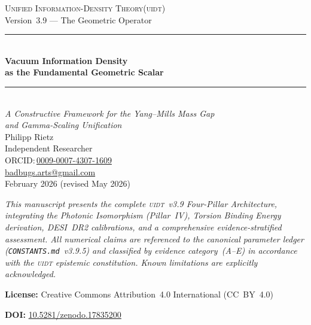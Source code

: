 \begin{titlepage}
\pagestyle{empty}
\begin{center}

\vspace*{1.5cm}

{\large\scshape Unified Information-Density Theory\quad(\textsc{uidt})}\\[0.4cm]
{\normalsize Version~3.9 --- The Geometric Operator}\\[1.5cm]

\rule{\textwidth}{1.2pt}\\[0.5cm]

{\Huge\bfseries Vacuum Information Density\\[0.4cm]
as the Fundamental Geometric Scalar}\\[0.5cm]

\rule{\textwidth}{0.6pt}\\[0.8cm]

{\Large\itshape A Constructive Framework for the Yang--Mills Mass Gap\\[0.2cm]
and Gamma-Scaling Unification}\\[2.5cm]

{\large Philipp Rietz}\\[0.3cm]
{\normalsize Independent Researcher}\\[0.15cm]
{\small ORCID:\,\href{https://orcid.org/0009-0007-4307-1609}{0009-0007-4307-1609}}\\[0.1cm]
{\small \href{mailto:badbugs.arts@gmail.com}{badbugs.arts@gmail.com}}\\[1.5cm]

{\normalsize February 2026 (revised May 2026)}\\[0.8cm]

\begin{tcolorbox}[
  enhanced, width=0.88\textwidth,
  colback=black!3, colframe=black!25, arc=4pt, boxrule=0.5pt,
  left=12pt, right=12pt, top=10pt, bottom=10pt,
]
{\small\itshape
This manuscript presents the complete \textsc{uidt}~v3.9 Four-Pillar
Architecture, integrating the Photonic Isomorphism (Pillar~IV), Torsion
Binding Energy derivation, DESI~DR2 calibrations, and a comprehensive
evidence-stratified assessment. All numerical claims are referenced to the
canonical parameter ledger (\texttt{CONSTANTS.md}~v3.9.5) and classified
by evidence category~(A--E) in accordance with the \textsc{uidt} epistemic
constitution. Known limitations are explicitly acknowledged.\par\medskip
\textbf{License:} Creative Commons Attribution~4.0 International (CC~BY~4.0)\par
\textbf{DOI:} \href{https://doi.org/10.5281/zenodo.17835200}%
  {10.5281/zenodo.17835200}
}
\end{tcolorbox}


\end{center}
\end{titlepage}
